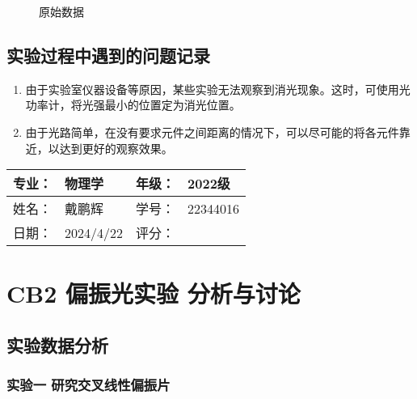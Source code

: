 \documentclass[dvipsnames, svgnames,a4paper,11pt]{article}
\begin{document}
	\begin{figure}[htbp]
		\centering
		\quad
		\quad
		\quad
		\quad

		\caption{原始数据}
		\label{fig:data}
	\end{figure}



\subsection{实验过程中遇到的问题记录}

\begin{enumerate}
	\item 由于实验室仪器设备等原因，某些实验无法观察到消光现象。这时，可使用光功率计，将光强最小的位置定为消光位置。
	\item 由于光路简单，在没有要求元件之间距离的情况下，可以尽可能的将各元件靠近，以达到更好的观察效果。
	
\end{enumerate}
	

\clearpage
\begin{table}
	\renewcommand\arraystretch{1.7}
	\begin{tabularx}{\textwidth}{|X|X|X|X|}
	\hline
	专业：& 物理学 &年级：& 2022级\\
	\hline
	姓名： & 戴鹏辉 & 学号：& 22344016\\
	\hline
    日期：& 2024/4/22 & 评分： &\\
	\hline
	\end{tabularx}
\end{table}

\section{CB2 \quad 偏振光实验 \quad\heiti 分析与讨论}

\subsection{实验数据分析}

	\subsubsection{实验一 \quad 研究交叉线性偏振片}
\end{document}
